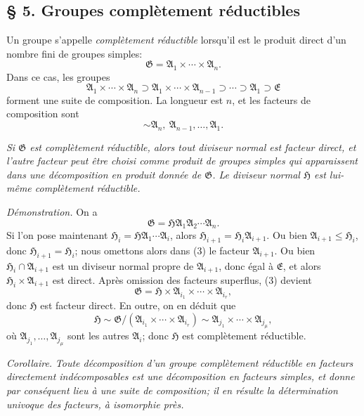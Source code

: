 
\providecommand{\mG}{\mathfrak{G}}
\providecommand{\mA}{\mathfrak{A}}
\providecommand{\mE}{\mathfrak{E}}
\providecommand{\mH}{\mathfrak{H}}

\subsection*{\S{} 5. Groupes complètement réductibles}

Un groupe s'appelle \emph{complètement réductible} lorsqu'il est le produit direct d'un nombre fini de groupes simples:
\[
        \mG=\mA_1\times\cdots\times\mA_n.
\]
Dans ce cas, les groupes
\[
        \mA_1\times\cdots\times\mA_n
        \supset \mA_1\times\cdots\times\mA_{n-1}
        \supset\cdots\supset \mA_1\supset \mE
\]
forment une suite de composition. La longueur est $n$, et les facteurs de composition sont
\[
        \sim \mA_n,\ \mA_{n-1},\ldots,\mA_1.
\]

\emph{Si $\mG$ est complètement réductible, alors tout diviseur normal est facteur direct, et l'autre facteur peut être choisi comme produit de groupes simples qui apparaissent dans une décomposition en produit donnée de $\mG$. Le diviseur normal $\mH$ est lui-même complètement réductible.}

\emph{Démonstration.} On a
\begin{equation}
        \mG=\mH\mA_1\mA_2\cdots\mA_n.             \tag{3}
\end{equation}
Si l'on pose maintenant $\mH_i=\mH\mA_1\cdots\mA_i$, alors $\mH_{i+1}=\mH_i\mA_{i+1}$. Ou bien $\mA_{i+1}\leq \mH_i$, donc $\mH_{i+1}=\mH_i$; nous omettons alors dans (3) le facteur $\mA_{i+1}$. Ou bien $\mH_i\cap\mA_{i+1}$ est un diviseur normal propre de $\mA_{i+1}$, donc égal à $\mE$, et alors $\mH_i\times\mA_{i+1}$ est direct. Après omission des facteurs superflus, (3) devient
\[
        \mG=\mH\times\mA_{i_1}\times\cdots\times\mA_{i_r},
\]
donc $\mH$ est facteur direct. En outre, on en déduit que
\[
        \mH\sim \mG/(\mA_{i_1}\times\cdots\times\mA_{i_r})
        \sim \mA_{j_1}\times\cdots\times\mA_{j_\mu},
\]
où $\mA_{j_1},\ldots,\mA_{j_\mu}$ sont les autres $\mA_i$; donc $\mH$ est complètement réductible.

\emph{Corollaire.} \emph{Toute décomposition d'un groupe complètement réductible en facteurs directement indécomposables est une décomposition en facteurs simples, et donne par conséquent lieu à une suite de composition; il en résulte la détermination univoque des facteurs, à isomorphie près.}
